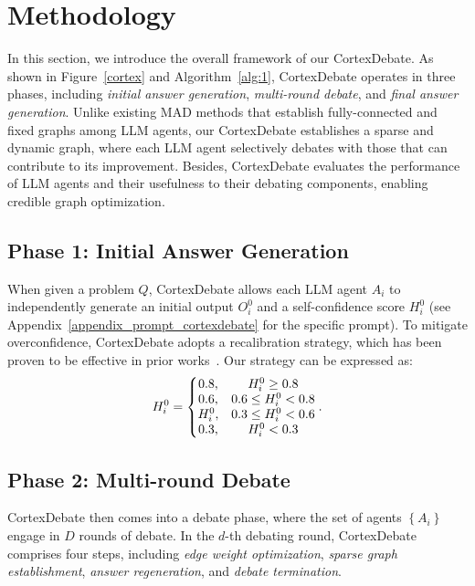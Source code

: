 \section{Methodology}
\label{main_method}
In this section, we introduce the overall framework of our CortexDebate. As shown in Figure~\ref{cortex} and Algorithm~\ref{alg:1}, CortexDebate operates in three phases, including \textit{initial answer generation}, \textit{multi-round debate}, and \textit{final answer generation}. Unlike existing MAD methods that establish fully-connected and fixed graphs among LLM agents, our CortexDebate establishes a sparse and dynamic graph, where each LLM agent selectively debates with those that can contribute to its improvement. Besides, CortexDebate evaluates the performance of LLM agents and their usefulness to their debating components, enabling credible graph optimization.

\subsection{Phase 1: Initial Answer Generation}
\label{phase_1}
When given a problem $Q$, CortexDebate allows each LLM agent $A_{i}$ to independently generate an initial output $O_{i}^{0}$ and a self-confidence score $H_{i}^{0}$ (see Appendix~\ref{appendix_prompt_cortexdebate} for the specific prompt). To mitigate overconfidence, CortexDebate adopts a recalibration strategy, which has been proven to be effective in prior works~\cite{chen2023reconcile}. Our strategy can be expressed as:
\begin{equation}
\setlength{\abovedisplayskip}{1mm}
\setlength{\belowdisplayskip}{1mm}
  \label{recalibrate}
  H_{i}^{0} = \left\{\begin{matrix}0.8,
  &H_{i}^{0}\ge 0.8 \\0.6,
  &0.6\le H_{i}^{0}< 0.8 \\H_{i}^{0},
  &0.3\le H_{i}^{0}< 0.6 \\0.3,
  &H_{i}^{0}< 0.3
\end{matrix}\right..
\end{equation}

\subsection{Phase 2: Multi-round Debate}
\label{phase_2}
CortexDebate then comes into a debate phase, where the set of agents $\left \{A_{i} \right \}$ engage in $D$ rounds of debate. In the $d$-th debating round, CortexDebate comprises four steps, including \textit{edge weight optimization}, \textit{sparse graph establishment}, \textit{answer regeneration}, and \textit{debate termination}.


